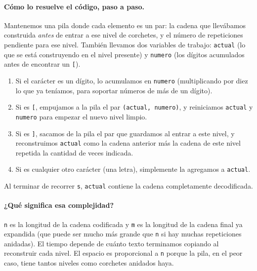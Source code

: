 \paragraph{Cómo lo resuelve el código, paso a paso.} Mantenemos una pila
donde cada elemento es un par: la cadena que llevábamos construida
\emph{antes} de entrar a ese nivel de corchetes, y el número de
repeticiones pendiente para ese nivel. También llevamos dos variables de
trabajo: \texttt{actual} (lo que se está construyendo en el nivel presente)
y \texttt{numero} (los dígitos acumulados antes de encontrar un \texttt{[}).
\begin{enumerate}
  \item Si el carácter es un dígito, lo acumulamos en \texttt{numero}
        (multiplicando por diez lo que ya teníamos, para soportar números
        de más de un dígito).
  \item Si es \texttt{[}, empujamos a la pila el par
        \texttt{(actual, numero)}, y reiniciamos \texttt{actual} y
        \texttt{numero} para empezar el nuevo nivel limpio.
  \item Si es \texttt{]}, sacamos de la pila el par que guardamos al
        entrar a este nivel, y reconstruimos \texttt{actual} como la
        cadena anterior más la cadena de este nivel repetida la cantidad
        de veces indicada.
  \item Si es cualquier otro carácter (una letra), simplemente la
        agregamos a \texttt{actual}.
\end{enumerate}
Al terminar de recorrer \texttt{s}, \texttt{actual} contiene la cadena
completamente decodificada.




\paragraph{¿Qué significa esa complejidad?} \texttt{n} es la longitud de la
cadena codificada y \texttt{m} es la longitud de la cadena final ya
expandida (que puede ser mucho más grande que \texttt{n} si hay muchas
repeticiones anidadas). El tiempo depende de cuánto texto terminamos
copiando al reconstruir cada nivel. El espacio es proporcional a
\texttt{n} porque la pila, en el peor caso, tiene tantos niveles como
corchetes anidados haya.

